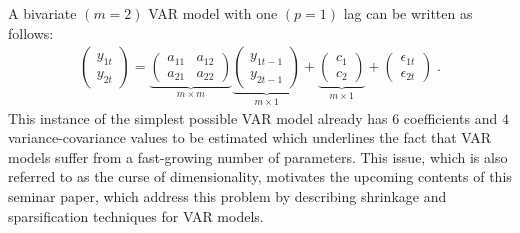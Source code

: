A bivariate $(m = 2)$ VAR model with one $(p = 1)$ lag can be written as follows:
\begin{align}
    \begin{pmatrix}
        y_{1t}\\
        y_{2t}
    \end{pmatrix}
    =
    \underbrace{
        \begin{pmatrix}
            a_{11} & a_{12}\\
            a_{21} & a_{22}
        \end{pmatrix}
    }_{m \times m}
    \underbrace{
        \begin{pmatrix}
            y_{1t-1}\\
            y_{2t-1}
        \end{pmatrix}
    }_{m \times 1}
    +
    \underbrace{
        \begin{pmatrix}
            c_1\\
            c_2
        \end{pmatrix}
    }_{m \times 1}
    +
    \begin{pmatrix}
        \epsilon_{1t}\\
        \epsilon_{2t}
    \end{pmatrix}
    \; \text{.}
\end{align}
This instance of the simplest possible VAR model already has $6$ coefficients and $4$ variance-covariance values to be estimated which underlines the fact that VAR models suffer from a fast-growing number of parameters. This issue, which is also referred to as the curse of dimensionality, motivates the upcoming contents of this seminar paper, which address this problem by describing shrinkage and sparsification techniques for VAR models.
